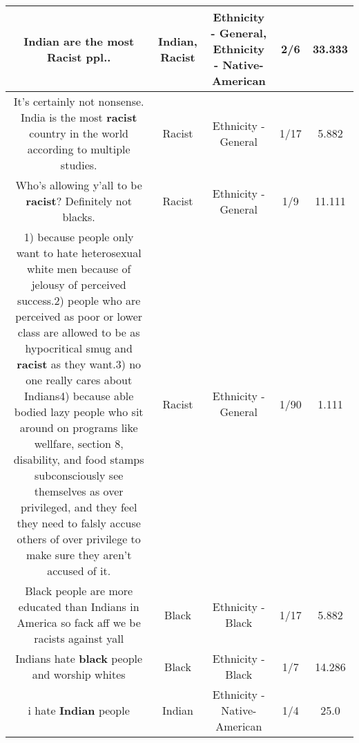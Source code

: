 \documentclass[11pt]{article}
\newlength\mylength
\begin{document}
\begin{center}
\begin{longtable}{|C{.65\mylength}|C{.30\mylength}|C{.12\mylength}|C{.12\mylength}|C{.12\mylength}|}
  \small Indian are the most \textbf{Racist} ppl..\normalsize   & Indian, Racist & Ethnicity - General, Ethnicity - Native-American & 2/6 & 33.333 \\  \hline
  \small It's certainly not nonsense. India is the most \textbf{racist} country in the world according to multiple studies.\normalsize   & Racist & Ethnicity - General & 1/17 & 5.882 \\  \hline
  \small Who's allowing y'all to be \textbf{racist}? Definitely not blacks.\normalsize   & Racist & Ethnicity - General & 1/9 & 11.111 \\  \hline
  \small 1) because people only want to hate heterosexual white men because of jelousy of perceived success.2) people who are perceived as poor or lower class are allowed to be as hypocritical smug and \textbf{racist} as they want.3) no one really cares about Indians4) because able bodied lazy people who sit around on programs like wellfare, section 8, disability, and food stamps subconsciously see themselves as over privileged, and they feel they need to falsly accuse others of over privilege to make sure they aren't accused of it.\normalsize   & Racist & Ethnicity - General & 1/90 & 1.111 \\  \hline
  \small Black people are more educated than Indians in America so fack aff we be racists against yall\normalsize   & Black & Ethnicity - Black & 1/17 & 5.882 \\  \hline
  \small Indians hate \textbf{black} people and worship whites\normalsize   & Black & Ethnicity - Black & 1/7 & 14.286 \\  \hline
  \small i hate \textbf{Indian} people\normalsize   & Indian & Ethnicity - Native-American & 1/4 & 25.0 \\  \hline

\end{longtable}
\end{center}
\end{document}
